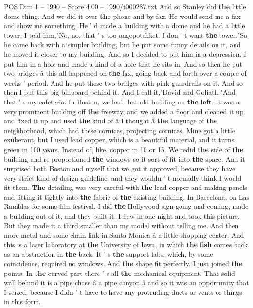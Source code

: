 \begin{textsample}{POS Dim 1 – 1990 – Score 4.00 – 1990/t000287.txt}
And so Stanley did \textbf{the} little dome thing.
And we did it over \textbf{the} phone and by fax.
He would send me a fax and show me something.
He ' d made a building with a dome and he had a little tower.
I told him,"No, no, that ' s too ongepotchket.
I don ' t want \textbf{the} tower."So he came back with a simpler building, but he put some funny details on it, and he moved it closer to my building.
And so I decided to put him in a depression.
I put him in a hole and made a kind of a hole that he sits in.
And so then he put two bridges â this all happened on \textbf{the} fax, going back and forth over a couple of weeks ' period.
And he put these two bridges with pink guardrails on it.
And so then I put this big billboard behind it.
And I call it,"David and Goliath."And that ' s my cafeteria.
In Boston, we had that old building on \textbf{the} \textbf{left}.
It was a very prominent building off \textbf{the} freeway, and we added a floor and cleaned it up and fixed it up and used \textbf{the} kind of â I thought â \textbf{the} language of \textbf{the} neighborhood, which had these cornices, projecting cornices.
Mine got a little exuberant, but I used lead copper, which is a beautiful material, and it turns green in 100 years.
Instead of, like, copper in 10 or 15.
We redid \textbf{the} side of \textbf{the} building and re-proportioned \textbf{the} windows so it sort of fit into \textbf{the} space.
And it surprised both Boston and myself that we got it approved, because they have very strict kind of design guideline, and they wouldn ' t normally think I would fit them. \textbf{The} detailing was very careful with \textbf{the} lead copper and making panels and fitting it tightly into \textbf{the} fabric of \textbf{the} existing building.
In Barcelona, on Las Ramblas for some film festival, I did \textbf{the} Hollywood sign going and coming, made a building out of it, and they built it.
I flew in one night and took this picture.
But they made it a third smaller than my model without telling me.
And then more metal and some chain link in Santa Monica â a little shopping center.
And this is a laser laboratory at \textbf{the} University of Iowa, in which \textbf{the} \textbf{fish} comes back as an abstraction in \textbf{the} back.
It ' s \textbf{the} support labs, which, by some coincidence, required no windows.
And \textbf{the} shape fit perfectly.
I just joined \textbf{the} points.
In \textbf{the} curved part there ' s all \textbf{the} mechanical equipment.
That solid wall behind it is a pipe chase â a pipe canyon â and so it was an opportunity that I seized, because I didn ' t have to have any protruding ducts or vents or things in this form.

\end{textsample}
